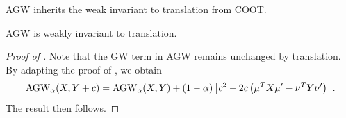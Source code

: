 AGW inherits the weak invariant to translation from COOT.
\begin{proposition}
\label{prop:invariant}
AGW is weakly invariant to translation.
\end{proposition}
\begin{proof}[Proof of ]
Note that the GW term in AGW remains unchanged by translation.
By adapting the proof of , we obtain
\begin{align}
    \text{AGW}_{\alpha}(X, Y + c) = \text{AGW}_{\alpha}(X, Y) + (1 - \alpha) \left[ c^2
    - 2 c \left( \mu^T X \mu' - \nu^T Y \nu' \right) \right].
\end{align}
The result then follows.
\end{proof}